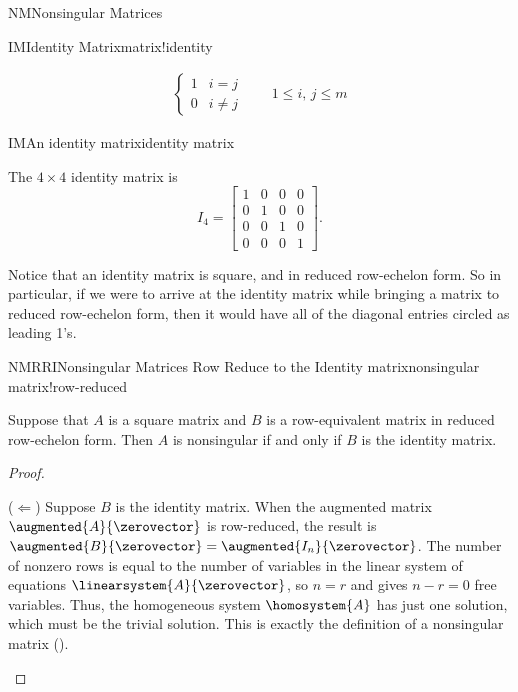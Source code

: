 \begin{subsect}{NM}{Nonsingular Matrices}
\begin{definition}{IM}{Identity Matrix}{matrix!identity}
\begin{para}
\begin{align*}
\begin{cases}
1 & i=j\\
0 & i\neq j
\end{cases}
\quad\quad
1\leq i,\,j\leq m
\end{align*}
\end{para}
%
%
\end{definition}
%
\begin{example}{IM}{An identity matrix}{identity matrix}
\begin{para}The $4\times 4$ identity matrix is
\begin{equation*}
I_4=
\begin{bmatrix}
1&0&0&0\\
0&1&0&0\\
0&0&1&0\\
0&0&0&1
\end{bmatrix}.
\end{equation*}
\end{para}
\end{example}
%
\begin{para}Notice that an identity matrix is square, and in reduced row-echelon form.  So in particular, if we were to arrive at the identity matrix while bringing a matrix to reduced row-echelon form, then it would have all of the diagonal entries circled as leading 1's.\end{para}
%
%
\begin{theorem}{NMRRI}{Nonsingular Matrices Row Reduce to the Identity matrix}{nonsingular matrix!row-reduced}
\begin{para}Suppose that $A$ is a square matrix and $B$ is a row-equivalent matrix in reduced row-echelon form.  Then $A$ is nonsingular if and only if $B$ is the identity matrix.\end{para}
\end{theorem}
%
\begin{proof}
\begin{para}($\Leftarrow$)  Suppose $B$ is the identity matrix.  When the augmented matrix $\augmented{A}{\zerovector}$ is row-reduced, the result is $\augmented{B}{\zerovector}=\augmented{I_n}{\zerovector}$.  The number of nonzero rows is equal to the number of variables in the linear system of equations $\linearsystem{A}{\zerovector}$, so $n=r$ and  gives $n-r=0$ free variables.  Thus, the homogeneous system $\homosystem{A}$ has just one solution, which must be the trivial solution.  This is exactly the definition of a nonsingular matrix ().\end{para}

\end{proof}
\end{subsect}
